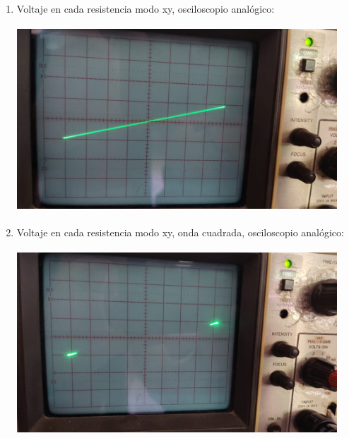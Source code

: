 \documentclass[12pt]{article}
\begin{document}
\begin{enumerate}
		\item Voltaje en cada resistencia modo xy, osciloscopio analógico:
		
		\includegraphics[width=12cm,height=7cm]{Img/lab_5_img_4}
		
		\item Voltaje en cada resistencia modo xy, onda cuadrada, osciloscopio analógico:
		
		\includegraphics[width=12cm,height=7cm]{Img/lab_5_img_5}
		
	\end{enumerate}
	
	\newpage
	
\end{document}
